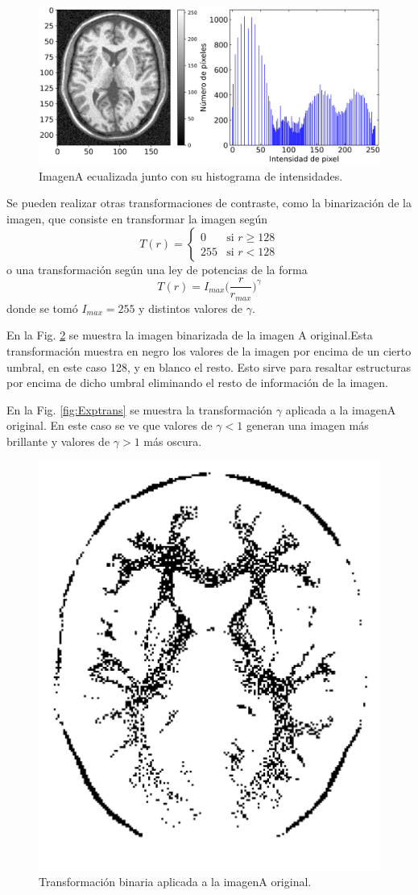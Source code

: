 \documentclass[letterpaper,12pt]{article}
\theoremstyle{plain}
\begin{document}
\begin{figure}[h]
    \centering
        \includegraphics[width=\linewidth]{Figuras/ImageA_EQ_hist.png}
    \caption{ImagenA ecualizada junto con su histograma de intensidades.} 
    \label{fig:EQ}
\end{figure}

Se pueden realizar otras transformaciones de contraste, como la binarización de la imagen, que consiste en transformar la imagen según 
\begin{equation}
    T(r) = 
    \begin{cases}
    0 & \text{si } r \geq 128 \\
    255 & \text{si } r < 128
    \end{cases}
\end{equation}
o una transformación según una ley de potencias de la forma
\begin{equation}
    T(r) = I_{max} \biggr( \frac{r}{r_{max}}\biggr)^\gamma
\end{equation}
donde se tomó $I_{max} = 255$ y distintos valores de $\gamma$.

En la Fig. \ref{fig:binarytrans} se muestra la imagen binarizada de la imagen A original.Esta transformación muestra en negro los valores de la imagen por encima de un cierto umbral, en este caso 128, y en blanco el resto. Esto sirve para resaltar estructuras por encima de dicho umbral eliminando el resto de información de la imagen. 

En la Fig. \ref{fig:Exptrans} se muestra la transformación $\gamma$ aplicada a la imagenA original. En este caso se ve que valores de $\gamma < 1$ generan una imagen más brillante y valores de $\gamma > 1 $ más oscura.

\begin{figure}[h]
    \centering
        \includegraphics[width=0.4\linewidth]{Figuras/ImageA_binary.png}
    \caption{Transformación binaria aplicada a la imagenA original.}
    \label{fig:binarytrans}
\end{figure}
\end{document}
